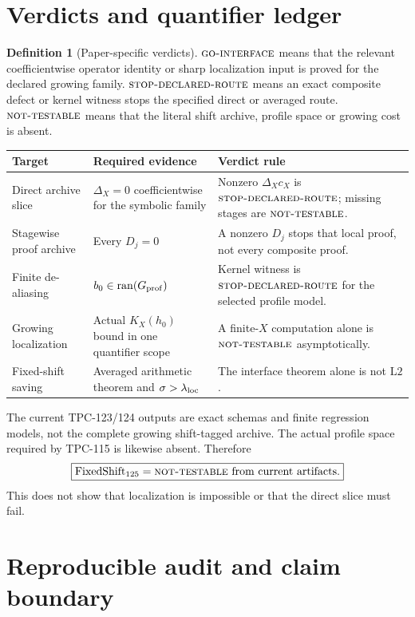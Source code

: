 \documentclass[11pt]{article}
\theoremstyle{definition}
\newtheorem{definition}[theorem]{Definition}
\theoremstyle{remark}
\newcommand{\Ran}{\operatorname{ran}}
\newcommand{\Ltwo}{\mathrm{L2}}
\newcommand{\GOI}{\textsc{go-interface}}
\newcommand{\STOP}{\textsc{stop-declared-route}}
\newcommand{\NT}{\textsc{not-testable}}
\begin{document}
\section{Verdicts and quantifier ledger}

\begin{definition}[Paper-specific verdicts]
\(\GOI\) means that the relevant coefficientwise operator identity or
sharp localization input is proved for the declared growing family.
\(\STOP\) means an exact composite defect or kernel witness stops the
specified direct or averaged route.  \(\NT\) means that the literal
shift archive, profile space or growing cost is absent.
\end{definition}

\begin{center}
\small
\begin{tabularx}{\textwidth}{@{}P{0.23\textwidth}P{0.31\textwidth}Y@{}}
\toprule
Target & Required evidence & Verdict rule\\
\midrule
Direct archive slice
& \(\Delta_X=0\) coefficientwise for the symbolic family
& Nonzero \(\Delta_Xc_X\) is \(\STOP\); missing stages are \(\NT\).\\
Stagewise proof archive
& Every \(D_j=0\)
& A nonzero \(D_j\) stops that local proof, not every composite proof.\\
Finite de-aliasing
& \(b_0\in\Ran(G_{\rm prof})\)
& Kernel witness is \(\STOP\) for the selected profile model.\\
Growing localization
& Actual \(K_X(h_0)\) bound in one quantifier scope
& A finite-\(X\) computation alone is \(\NT\) asymptotically.\\
Fixed-shift saving
& Averaged arithmetic theorem and \(\sigma>\lambda_{\rm loc}\)
& The interface theorem alone is not \(\Ltwo\).\\
\bottomrule
\end{tabularx}
\end{center}

The current TPC-123/124 outputs are exact schemas and finite
regression models, not the complete growing shift-tagged archive.
The actual profile space required by TPC-115 is likewise absent.
Therefore
\[
 \boxed{
 \operatorname{FixedShift}_{125}
 =
 \NT\ \text{from current artifacts}.}
\]
This does not show that localization is impossible or that the
direct slice must fail.

\section{Reproducible audit and claim boundary}
\end{document}
